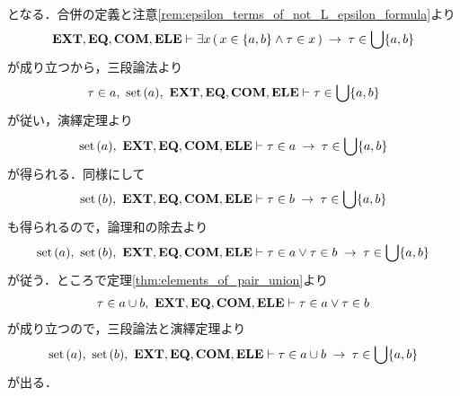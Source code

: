 \begin{sketch}
\begin{description}
\begin{align}
				\end{align}
				となる．合併の定義と注意\ref{rem:epsilon_terms_of_not_L_epsilon_formula}より
				\begin{align}
					\mbox{{\bf EXT}},\mbox{{\bf EQ}},\mbox{\bf COM},\mbox{{\bf ELE}} \vdash \exists x\, (\, x \in \{a,b\} \wedge \tau \in x\, )
					\hspace{0.25em}\rightarrow\hspace{0.25em} \tau \in \bigcup \{a,b\}
				\end{align}
				が成り立つから，三段論法より
				\begin{align}
					\tau \in a,\ \operatorname*{set}\hspace{0.15em}(a),\ \mbox{{\bf EXT}},\mbox{{\bf EQ}},\mbox{\bf COM},\mbox{{\bf ELE}} \vdash \tau \in \bigcup \{a,b\}
				\end{align}
				が従い，演繹定理より
				\begin{align}
					\operatorname*{set}\hspace{0.15em}(a),\ \mbox{{\bf EXT}},\mbox{{\bf EQ}},\mbox{\bf COM},\mbox{{\bf ELE}} \vdash 
					\tau \in a \hspace{0.25em}\rightarrow\hspace{0.25em} \tau \in \bigcup \{a,b\}
				\end{align}
				が得られる．同様にして
				\begin{align}
					\operatorname*{set}\hspace{0.15em}(b),\ \mbox{{\bf EXT}},\mbox{{\bf EQ}},\mbox{\bf COM},\mbox{{\bf ELE}} \vdash \tau \in b \hspace{0.25em}\rightarrow\hspace{0.25em} \tau \in \bigcup \{a,b\}
				\end{align}
				も得られるので，論理和の除去より
				\begin{align}
					\operatorname*{set}\hspace{0.15em}(a),\ \operatorname*{set}\hspace{0.15em}(b),\ \mbox{{\bf EXT}},\mbox{{\bf EQ}},\mbox{\bf COM},\mbox{{\bf ELE}} \vdash 
					\tau \in a \vee \tau \in b \hspace{0.25em}\rightarrow\hspace{0.25em} \tau \in \bigcup \{a,b\}
				\end{align}
				が従う．ところで定理\ref{thm:elements_of_pair_union}より
				\begin{align}
					\tau \in a \cup b,\ \mbox{{\bf EXT}},\mbox{{\bf EQ}},\mbox{\bf COM},\mbox{{\bf ELE}} \vdash \tau \in a \vee \tau \in b
				\end{align}
				が成り立つので，三段論法と演繹定理より
				\begin{align}
					\operatorname*{set}\hspace{0.15em}(a),\ \operatorname*{set}\hspace{0.15em}(b),\ \mbox{{\bf EXT}},\mbox{{\bf EQ}},\mbox{\bf COM},\mbox{{\bf ELE}} \vdash 
					\tau \in a \cup b \hspace{0.25em}\rightarrow\hspace{0.25em} \tau \in \bigcup \{a,b\}
					\label{fom:union_of_two_sets_is_union_of_pair_5}
				\end{align}
				が出る．
				

\end{description}
\end{sketch}
